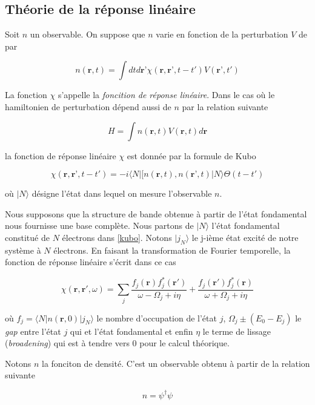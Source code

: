 \documentclass[12pt]{report}
\theoremstyle{theoreme}
\begin{document}
\subsection{Théorie de la réponse linéaire}
Soit $n$ un observable. On suppose que $n$ varie en fonction de la perturbation $V$ de par 

$$
n(\textbf{r}, t) = \int dt d\textbf{r'}  \chi (\textbf{r}, \textbf{r'}, t-t') V(\textbf{r'}, t')
$$

La fonction $\chi$ s'appelle la \textit{foncition de réponse linéaire}. Dans le cas où le hamiltonien de perturbation dépend aussi de $n$ par la relation suivante

$$
H = \int n(\textbf{r}, t) V(\textbf{r}, t) d\textbf{r}
$$

la fonction de réponse linéaire $\chi$ est donnée par la formule de Kubo\cite{Ton12}

\begin{equation}\label{kubo}
\chi (\textbf{r}, \textbf{r'}, t-t') = -i \langle N | [n(\textbf{r}, t), n(\textbf{r'}, t) |N \rangle \Theta(t-t')
\end{equation}

où $|N \rangle $ désigne l'état dans lequel on mesure l'observable $n$.

Nous supposons que la structure de bande obtenue à partir de l'état fondamental nous fournisse une base complète. Nous partons de $|N \rangle$ l'état fondamental constitué de $N$ électrons dans \ref{kubo}. Notons $| j_N \rangle $ le j-ième état excité de notre système à $N$ électrons. En faisant la transformation de Fourier temporelle, la fonction de réponse linéaire s'écrit dans ce cas 

\begin{equation}
\chi (\textbf{r}, \textbf{r}', \omega) = \sum_j \frac{f_j(\textbf{r}) f_j^*(\textbf{r}') }{\omega - \Omega_j + i \eta} + \frac{f_j(\textbf{r}') f_j^*(\textbf{r}) }{\omega + \Omega_j + i \eta}
\end{equation}

où $f_j = \langle N | n(\textbf{r}, 0) | j_N \rangle$ le nombre d'occupation de l'état $j$, $\Omega_j \pm (E_0 - E_j)$ le \textit{gap} entre l'état $j$ qui et l'état fondamental et enfin $\eta$ le terme de lissage (\textit{broadening}) qui est à tendre vers 0 pour le calcul théorique.

Notons $n$ la fonciton de densité. C'est un observable obtenu à partir de la relation suivante 

$$
n = \psi^\dagger \psi
$$
\end{document}
